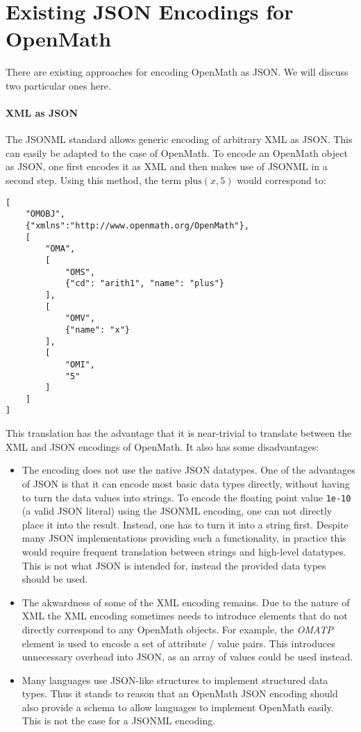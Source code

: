 \section{Existing JSON Encodings for OpenMath}\label{sec:ex}

There are existing approaches for encoding OpenMath as JSON.  We will discuss two
particular ones here.

\paragraph{XML as JSON}
The JSONML standard\cite{jsonml:webpage} allows generic encoding of arbitrary XML as JSON. 
This can easily be adapted to the case of OpenMath. 
To encode an OpenMath object as JSON, one first encodes it as XML and then makes use of JSONML in a second step. 
Using this method, the term $\mathrm{plus}(x, 5)$ would correspond to: 
\begin{lstlisting}
[
    "OMOBJ",
    {"xmlns":"http://www.openmath.org/OpenMath"},
    [
        "OMA",
        [
            "OMS", 
            {"cd": "arith1", "name": "plus"}
        ],
        [
            "OMV", 
            {"name": "x"}
        ],
        [
            "OMI", 
            "5"
        ]
    ]
]
\end{lstlisting}

This translation has the advantage that it is near-trivial to translate between the XML and JSON encodings of OpenMath. 
It also has some disadvantages: 

\begin{itemize}
    \item The encoding does not use the native JSON datatypes. 
    One of the advantages of JSON is that it can encode most basic data types directly, without having to turn the data values into strings. 
    To encode the floating point value \lstinline{1e-10} (a valid JSON literal) using the JSONML encoding, one can not directly place it into the result. 
    Instead, one has to turn it into a string first.   
    Despite many JSON implementations providing such a functionality, in practice this would require frequent translation between strings and high-level datatypes.  
    This is not what JSON is intended for, instead the provided data types should be used. 

    \item The akwardness of some of the XML encoding remains. 
    Due to the nature of XML the XML encoding sometimes needs to introduce elements that do not directly correspond to any OpenMath objects. 
    For example, the \textit{OMATP} element is used to encode a set of attribute / value pairs. 
    This introduces unnecessary overhead into JSON, as an array of values could be used instead. 

    \item Many languages use JSON-like structures to implement structured data types. 
    Thus it stands to reason that an OpenMath JSON encoding should also provide a schema to allow languages to implement OpenMath easily. This is not the case for a JSONML encoding. 
\end{itemize}

